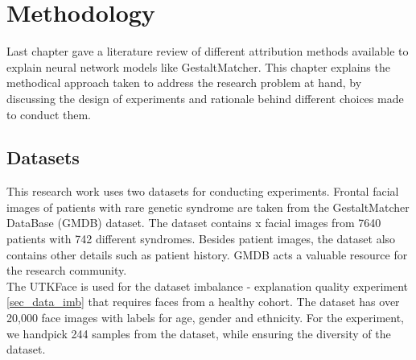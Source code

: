 \documentclass[../report.tex]{subfiles}
\begin{document}
    \chapter{Methodology}
	Last chapter gave a literature review of different attribution methods available to explain neural network models like GestaltMatcher. This chapter explains the methodical approach taken to address the research problem at hand, by discussing the design of experiments and rationale behind different choices made to conduct them. 
	\section{Datasets}
	This research work uses two datasets for conducting experiments. Frontal facial images of patients with rare genetic syndrome are taken from the GestaltMatcher DataBase (GMDB) dataset. The dataset contains \cite{}x facial images from 7640 patients with 742 different syndromes. Besides patient images, the dataset also contains other details such as patient history. GMDB acts a valuable resource for the research community.\\
	The UTKFace \cite{zhifei2017cvpr} is used for the dataset imbalance - explanation quality experiment   \ref{sec_data_imb} that requires faces from a healthy cohort. The dataset has over 20,000 face images with labels for age, gender and ethnicity. For the experiment, we handpick 244 samples from the dataset, while ensuring the diversity of the dataset.
	      
\end{document}

